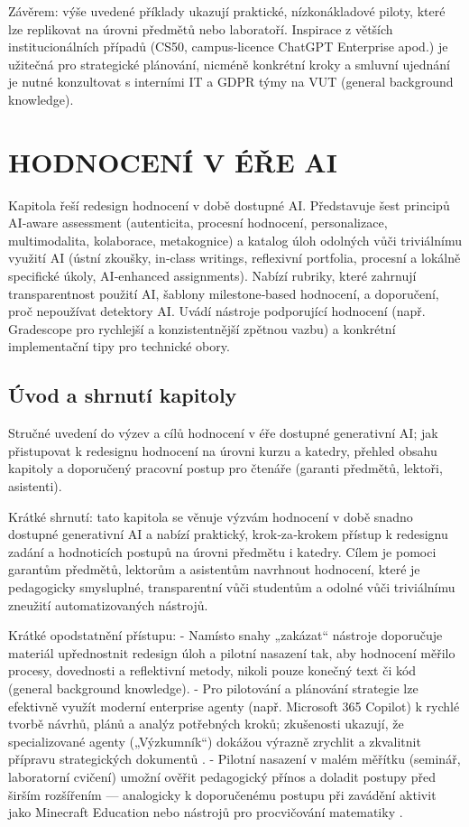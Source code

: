 \documentclass{report}%
\begin{document}
\medskip

Závěrem: výše uvedené příklady ukazují praktické, nízkonákladové piloty, které lze replikovat na úrovni předmětů nebo laboratoří. Inspirace z větších institucionálních případů (CS50, campus‑licence ChatGPT Enterprise apod.) je užitečná pro strategické plánování, nicméně konkrétní kroky a smluvní ujednání je nutné konzultovat s interními IT a GDPR týmy na VUT (general background knowledge).%

%
\chapter{HODNOCENÍ V ÉŘE AI}%
Kapitola řeší redesign hodnocení v době dostupné AI. Představuje šest principů AI‑aware assessment (autenticita, procesní hodnocení, personalizace, multimodalita, kolaborace, metakognice) a katalog úloh odolných vůči triviálnímu využití AI (ústní zkoušky, in‑class writings, reflexivní portfolia, procesní a lokálně specifické úkoly, AI‑enhanced assignments). Nabízí rubriky, které zahrnují transparentnost použití AI, šablony milestone‑based hodnocení, a doporučení, proč nepoužívat detektory AI. Uvádí nástroje podporující hodnocení (např. Gradescope pro rychlejší a konzistentnější zpětnou vazbu) a konkrétní implementační tipy pro technické obory.%
\section{Úvod a shrnutí kapitoly}%
Stručné uvedení do výzev a cílů hodnocení v éře dostupné generativní AI; jak přistupovat k redesignu hodnocení na úrovni kurzu a katedry, přehled obsahu kapitoly a doporučený pracovní postup pro čtenáře (garanti předmětů, lektoři, asistenti).%


%
Krátké shrnutí: tato kapitola se věnuje výzvám hodnocení v době snadno dostupné generativní AI a nabízí praktický, krok‑za‑krokem přístup k redesignu zadání a hodnoticích postupů na úrovni předmětu i katedry. Cílem je pomoci garantům předmětů, lektorům a asistentům navrhnout hodnocení, které je pedagogicky smysluplné, transparentní vůči studentům a odolné vůči triviálnímu zneužití automatizovaných nástrojů.

Krátké opodstatnění přístupu:
- Namísto snahy „zakázat“ nástroje doporučuje materiál upřednostnit redesign úloh a pilotní nasazení tak, aby hodnocení měřilo procesy, dovednosti a reflektivní metody, nikoli pouze konečný text či kód (general background knowledge).  
- Pro pilotování a plánování strategie lze efektivně využít moderní enterprise agenty (např. Microsoft 365 Copilot) k rychlé tvorbě návrhů, plánů a analýz potřebných kroků; zkušenosti ukazují, že specializované agenty („Výzkumník“) dokážou výrazně zrychlit a zkvalitnit přípravu strategických dokumentů \cite{kb_ai_101_tipu_pdf_04e4a115_page_48_1}.  
- Pilotní nasazení v malém měřítku (seminář, laboratorní cvičení) umožní ověřit pedagogický přínos a doladit postupy před širším rozšířením — analogicky k doporučenému postupu při zavádění aktivit jako Minecraft Education nebo nástrojů pro procvičování matematiky \cite{kb_ai_101_tipu_pdf_04e4a115_page_15_2, kb_ai_101_tipu_pdf_04e4a115_page_8_1}.
\end{document}
